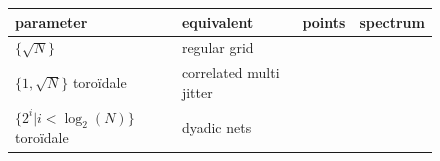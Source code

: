 \documentclass{classeENS}
\begin{document}
    \begin{figure}[H]
        \centering
        \begin{tabular}{|C{5cm}|C{2.5cm}||C{3cm}|L{3cm}|}
        \hline parameter & equivalent & points & spectrum \\
        \hline  
            $\{\sqrt N\}$ & 
            regular grid &
             & 
        \tabularnewline
        \hline  
            $\{1,\sqrt N\}$ toroïdale& 
            correlated multi jitter &
             & 
        \tabularnewline
        \hline  
            $\{2^i | i < \log_2(N) \}$ toroïdale & 
            dyadic nets &
             & 

\end{tabular}
\end{figure}
\end{document}
